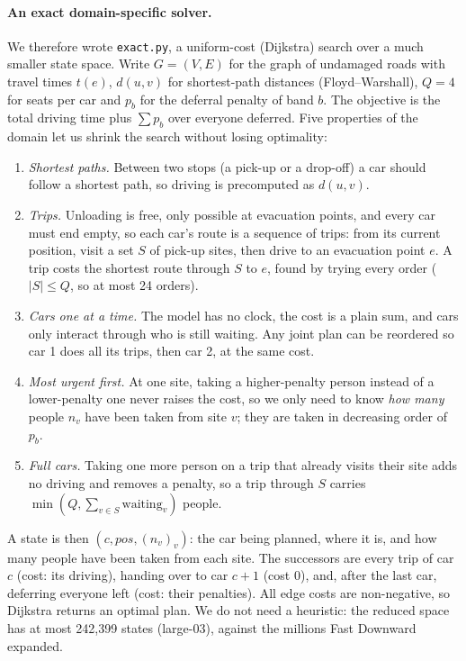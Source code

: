 \paragraph{An exact domain-specific solver.}
We therefore wrote \texttt{exact.py}, a uniform-cost (Dijkstra) search over a much smaller
state space. Write $G=(V,E)$ for the graph of undamaged roads with travel times $t(e)$,
$d(u,v)$ for shortest-path distances (Floyd--Warshall), $Q=4$ for seats per car and $p_b$ for
the deferral penalty of band $b$. The objective is the total driving time plus
$\sum p_b$ over everyone deferred. Five properties of the domain let us shrink the search
without losing optimality:
\begin{enumerate}
  \item \emph{Shortest paths.} Between two stops (a pick-up or a drop-off) a car should
    follow a shortest path, so driving is precomputed as $d(u,v)$.
  \item \emph{Trips.} Unloading is free, only possible at evacuation points, and every car
    must end empty, so each car's route is a sequence of trips: from its current position,
    visit a set $S$ of pick-up sites, then drive to an evacuation point $e$. A trip costs the
    shortest route through $S$ to $e$, found by trying every order ($|S| \le Q$, so at most
    24 orders).
  \item \emph{Cars one at a time.} The model has no clock, the cost is a plain sum, and cars
    only interact through who is still waiting. Any joint plan can be reordered so car 1
    does all its trips, then car 2, at the same cost.
  \item \emph{Most urgent first.} At one site, taking a higher-penalty person instead of a
    lower-penalty one never raises the cost, so we only need to know \emph{how many} people
    $n_v$ have been taken from site $v$; they are taken in decreasing order of $p_b$.
  \item \emph{Full cars.} Taking one more person on a trip that already visits their site
    adds no driving and removes a penalty, so a trip through $S$ carries
    $\min(Q, \sum_{v\in S} \text{waiting}_v)$ people.
\end{enumerate}
A state is then $(c, \mathit{pos}, (n_v)_{v})$: the car being planned, where it is, and how
many people have been taken from each site. The successors are every trip of car $c$
(cost: its driving), handing over to car $c{+}1$ (cost 0), and, after the last car,
deferring everyone left (cost: their penalties). All edge costs are non-negative, so Dijkstra
returns an optimal plan. We do not need a heuristic: the reduced space has at most 242{,}399
states (large-03), against the millions Fast Downward expanded.

